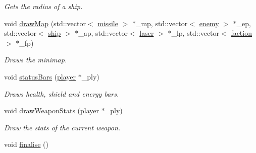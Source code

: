 \begin{DoxyCompactItemize}
\begin{DoxyCompactList}\small\item\em Gets the radius of a ship. \end{DoxyCompactList}\item 
void \hyperlink{classrenderer__ngl_a297f3cbb2e49b00369ec3803a380d130}{draw\-Map} (std\-::vector$<$ \hyperlink{classmissile}{missile} $>$ $\ast$\-\_\-mp, std\-::vector$<$ \hyperlink{classenemy}{enemy} $>$ $\ast$\-\_\-ep, std\-::vector$<$ \hyperlink{classship}{ship} $>$ $\ast$\-\_\-ap, std\-::vector$<$ \hyperlink{classlaser}{laser} $>$ $\ast$\-\_\-lp, std\-::vector$<$ \hyperlink{structfaction}{faction} $>$ $\ast$\-\_\-fp)
\begin{DoxyCompactList}\small\item\em Draws the minimap. \end{DoxyCompactList}\item 
void \hyperlink{classrenderer__ngl_a437b65ae85730f47dff971bef2b25068}{status\-Bars} (\hyperlink{classplayer}{player} $\ast$\-\_\-ply)
\begin{DoxyCompactList}\small\item\em Draws health, shield and energy bars. \end{DoxyCompactList}\item 
void \hyperlink{classrenderer__ngl_a6cd253dc107dcdbb19267654c7213772}{draw\-Weapon\-Stats} (\hyperlink{classplayer}{player} $\ast$\-\_\-ply)
\begin{DoxyCompactList}\small\item\em Draw the stats of the current weapon. \end{DoxyCompactList}\item 
\hypertarget{classrenderer__ngl_a585e3934d5261cbecff6aeb64b30bbd9}{void \hyperlink{classrenderer__ngl_a585e3934d5261cbecff6aeb64b30bbd9}{finalise} ()}\label{classrenderer__ngl_a585e3934d5261cbecff6aeb64b30bbd9}


\end{DoxyCompactItemize}

